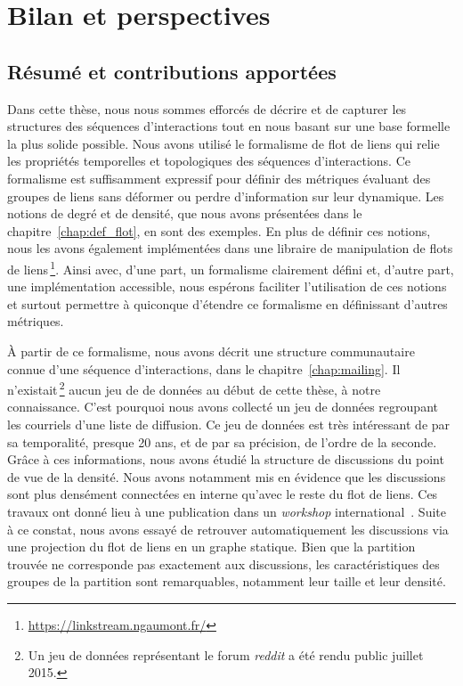 \chapter{Bilan et perspectives}
\label{Conclusion}

\section{Résumé et contributions apportées}

Dans cette thèse, nous nous sommes efforcés de décrire et de capturer les structures des séquences d'interactions tout en nous basant sur une base formelle la plus solide possible.
Nous avons utilisé le formalisme de flot de liens qui relie les propriétés temporelles et topologiques des séquences d'interactions.
Ce formalisme est suffisamment expressif pour définir des métriques évaluant des groupes de liens sans déformer ou perdre d'information sur leur dynamique.
Les notions de degré et de densité, que nous avons présentées dans le chapitre~\ref{chap:def_flot}, en sont des exemples.
En plus de définir ces notions, nous les avons également implémentées dans une libraire de manipulation de flots de liens\,\footnote{\url{https://linkstream.ngaumont.fr/}}.
Ainsi avec, d'une part, un formalisme clairement défini et, d'autre part, une implémentation accessible, nous espérons faciliter l'utilisation de ces notions et surtout permettre à quiconque d'étendre ce formalisme en définissant d'autres métriques.

\`A partir de ce formalisme, nous avons décrit une structure communautaire connue d'une séquence d'interactions, dans le chapitre~\ref{chap:mailing}.
Il n'existait\,\footnote{Un jeu de données représentant le forum \emph{reddit} a été rendu public juillet 2015.} aucun jeu de de données  au début de cette thèse, à notre connaissance.
C'est pourquoi nous avons collecté un jeu de données regroupant les courriels d'une liste de diffusion.
Ce jeu de données est très intéressant de par sa temporalité, presque 20 ans, et de par sa précision, de l'ordre de la seconde.
Grâce à ces informations, nous avons étudié la structure de discussions du point de vue de la densité.
Nous avons notamment mis en évidence que les discussions sont plus densément connectées en interne qu'avec le reste du flot de liens.
Ces travaux ont donné lieu à une publication dans un \emph{workshop} international~\cite{Gaumont2016}.
Suite à ce constat, nous avons essayé de retrouver automatiquement les discussions via une projection du flot de liens en un graphe statique.
Bien que la partition trouvée ne corresponde pas exactement aux discussions, les caractéristiques des groupes de la partition sont remarquables, notamment leur taille et leur densité.


